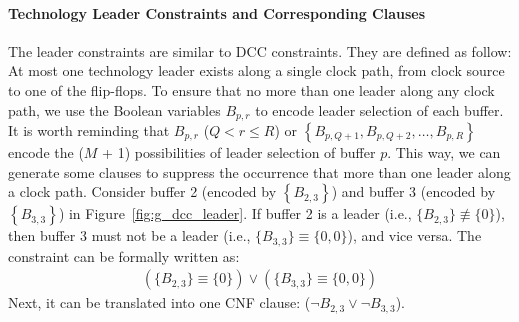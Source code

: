 \paragraph{Technology Leader Constraints and Corresponding Clauses}
\label{sec:TVA:leader_c}
The leader constraints are similar to DCC constraints. They are defined as follow: At most one technology leader exists along a single clock path, from clock source to one of the flip-flops. To ensure that no more than one leader along any clock path, we use the Boolean variables $B_{p,r}$ to encode leader selection of each buffer. It is worth reminding that $B_{p,r}$ ($Q < r \leq R$) or $\left\{B_{p,Q+1}, B_{p,Q+2},\dotsc, B_{p,R}\right\}$ encode the ($M$ + 1) possibilities of leader selection of buffer $p$. This way, we can generate some clauses to suppress the occurrence that more than one leader along a clock path. Consider buffer 2 (encoded by {\fontsize{8}{8.4}$\left\{B_{2,3}\right\}$}) and buffer 3 (encoded by {\fontsize{8}{8.4}$\left\{B_{3,3}\right\}$}) in Figure~\ref{fig:g_dcc_leader}. If buffer 2 is a leader (i.e., {\fontsize{8}{8.4}$\{B_{2,3}\} \not\equiv \{0\}$}), then buffer 3 must not be a leader (i.e., {\fontsize{8}{8.4}$\{B_{3,3}\} \equiv \{0, 0\}$}), and vice versa. The constraint can be formally written as:
{
\fontsize{8}{8.4}
\begin{gather*}
\left(\{B_{2,3}\} \equiv \{0\}\right) \lor \left(\{B_{3,3}\} \equiv \{0, 0\}\right)
\end{gather*}
}
Next, it can be translated into one CNF clause:
{\fontsize{8}{8.4}($\neg B_{2,3}\lor\neg B_{3,3}$).} 


